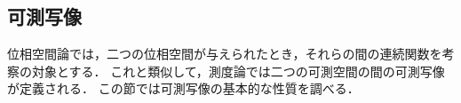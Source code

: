 \subsection{可測写像}

位相空間論では，二つの位相空間が与えられたとき，それらの間の連続関数を考察の対象とする．
これと類似して，測度論では二つの可測空間の間の可測写像が定義される．
この節では可測写像の基本的な性質を調べる．



